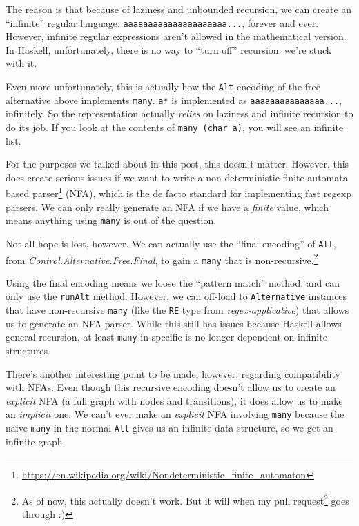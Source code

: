 \documentclass[]{article}
\renewcommand{\href}[2]{#2\footnote{\url{#1}}}
\begin{document}
The reason is that because of laziness and unbounded recursion, we can create an
``infinite'' regular language:
\texttt{a\textbar{}aa\textbar{}aaa\textbar{}aaaa\textbar{}aaaaa\textbar{}aaaaaa\textbar{}...},
forever and ever. However, infinite regular expressions aren't allowed in the
mathematical version. In Haskell, unfortunately, there is no way to ``turn off''
recursion: we're stuck with it.

Even more unfortunately, this is actually how the \texttt{Alt} encoding of the
free alternative above implements \texttt{many}. \texttt{a*} is implemented as
\texttt{\textbar{}a\textbar{}aa\textbar{}aaa\textbar{}aaaa\textbar{}aaaaa\textbar{}...},
infinitely. So the representation actually \emph{relies} on laziness and
infinite recursion to do its job. If you look at the contents of
\texttt{many\ (char\ \textquotesingle{}a\textquotesingle{})}, you will see an
infinite list.

For the purposes we talked about in this post, this doesn't matter. However,
this does create serious issues if we want to write a
\href{https://en.wikipedia.org/wiki/Nondeterministic_finite_automaton}{non-deterministic
finite automata based parser} (NFA), which is the de facto standard for
implementing fast regexp parsers. We can only really generate an NFA if we have
a \emph{finite} value, which means anything using \texttt{many} is out of the
question.

Not all hope is lost, however. We can actually use the ``final encoding'' of
\texttt{Alt}, from \emph{Control.Alternative.Free.Final}, to gain a
\texttt{many} that is non-recursive.\footnote{As of now, this actually doesn't
  work. But it will when my \href{https://github.com/ekmett/free/pull/188}{pull
  request} goes through :)}

Using the final encoding means we loose the ``pattern match'' method, and can
only use the \texttt{runAlt} method. However, we can off-load to
\texttt{Alternative} instances that have non-recursive \texttt{many} (like the
\texttt{RE} type from \emph{regex-applicative}) that allows us to generate an
NFA parser. While this still has issues because Haskell allows general
recursion, at least \texttt{many} in specific is no longer dependent on infinite
structures.

There's another interesting point to be made, however, regarding compatibility
with NFAs. Even though this recursive encoding doesn't allow us to create an
\emph{explicit} NFA (a full graph with nodes and transitions), it does allow us
to make an \emph{implicit} one. We can't ever make an \emph{explicit} NFA
involving \texttt{many} because the naive \texttt{many} in the normal
\texttt{Alt} gives us an infinite data structure, so we get an infinite graph.
\end{document}
